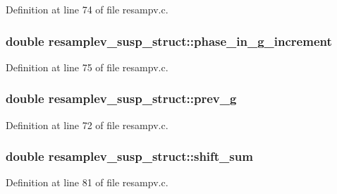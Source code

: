 Definition at line 74 of file resampv.\+c.

\subsubsection[{\texorpdfstring{phase\+\_\+in\+\_\+g\+\_\+increment}{phase_in_g_increment}}]{\setlength{\rightskip}{0pt plus 5cm}double resamplev\+\_\+susp\+\_\+struct\+::phase\+\_\+in\+\_\+g\+\_\+increment}\hypertarget{structresamplev__susp__struct_a8dcb861996f8858da4bc1193f57959dc}{}\label{structresamplev__susp__struct_a8dcb861996f8858da4bc1193f57959dc}


Definition at line 75 of file resampv.\+c.

\subsubsection[{\texorpdfstring{prev\+\_\+g}{prev_g}}]{\setlength{\rightskip}{0pt plus 5cm}double resamplev\+\_\+susp\+\_\+struct\+::prev\+\_\+g}\hypertarget{structresamplev__susp__struct_ab3c0619259c144334c422f1243cbff44}{}\label{structresamplev__susp__struct_ab3c0619259c144334c422f1243cbff44}


Definition at line 72 of file resampv.\+c.

\subsubsection[{\texorpdfstring{shift\+\_\+sum}{shift_sum}}]{\setlength{\rightskip}{0pt plus 5cm}double resamplev\+\_\+susp\+\_\+struct\+::shift\+\_\+sum}\hypertarget{structresamplev__susp__struct_a6d178f465a427471d3e4f8ef3a31eac7}{}\label{structresamplev__susp__struct_a6d178f465a427471d3e4f8ef3a31eac7}


Definition at line 81 of file resampv.\+c.

